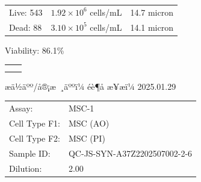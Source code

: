 \documentclass[UTF8,10pt,a4paper,fontset=fandol]{ctexart}
\newcommand{\fieldvalue}[1]{#1}
\newcommand{\handwritten}[1]{#1}
\begin{document}
\begin{center}
\begin{center}
\begin{tabularx}{\textwidth}{@{}X X X@{}}
Live:
\fieldvalue{543}
&
\fieldvalue{$1.92\times10^{6}$ cells/mL}
&
\fieldvalue{14.7 micron}
\\

Dead:
\fieldvalue{88}
&
\fieldvalue{$3.10\times10^{5}$ cells/mL}
&
\fieldvalue{14.1 micron}
\\
\end{tabularx}

\medskip
\noindent Viability:
\fieldvalue{86.1\%}

\medskip
\noindent
\begin{tabular}{cc}
\fbox{\rule{0pt}{0.22\textheight}\rule{0.43\textwidth}{0pt}}
&
\fbox{\rule{0pt}{0.22\textheight}\rule{0.43\textwidth}{0pt}}
\\[1em]
\fbox{\rule{0pt}{0.22\textheight}\rule{0.43\textwidth}{0pt}}
&
\fbox{\rule{0pt}{0.22\textheight}\rule{0.43\textwidth}{0pt}}
\end{tabular}

\vfill

\noindent
æä½äºº/å®¡æ ¸äººï¼
\fieldvalue{\handwritten{éè¶å}}
\hfill
æ¥æï¼
\fieldvalue{\handwritten{2025.01.29}}

\newpage

\noindent
\begin{tabular}{@{}ll@{}}
Assay:
&
\fieldvalue{MSC-1}
\\[3pt]
Cell Type F1:
&
\fieldvalue{MSC (AO)}
\\[3pt]
Cell Type F2:
&
\fieldvalue{MSC (PI)}
\\[3pt]
Sample ID:
&
\fieldvalue{QC-JS-SYN-A37Z2202507002-2-6}
\\[3pt]
Dilution:
&
\fieldvalue{2.00}
\end{tabular}


\end{center}
\end{center}
\end{document}

